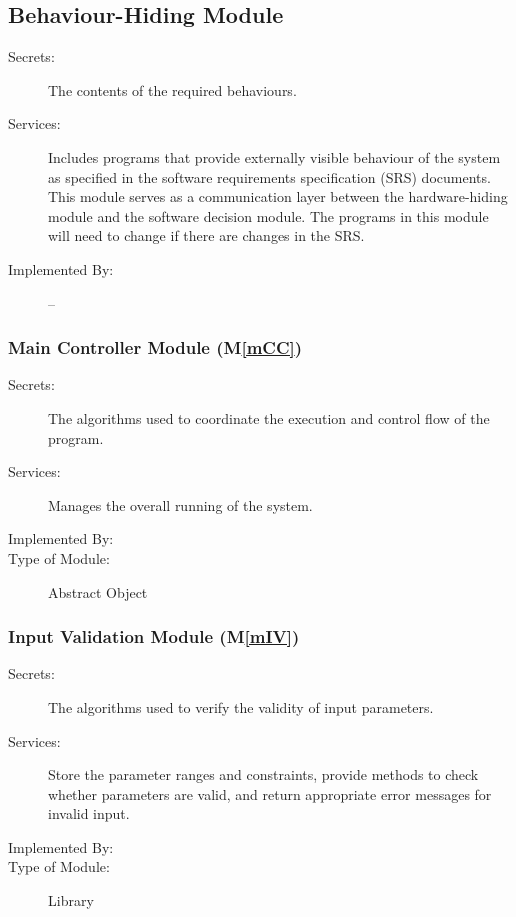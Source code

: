 \documentclass[12pt, titlepage]{article}
\newcommand{\mref}[1]{M\ref{#1}}
\begin{document}
\subsection{Behaviour-Hiding Module}

\begin{description}
\item[Secrets:]The contents of the required behaviours.
\item[Services:]Includes programs that provide externally visible behaviour of
  the system as specified in the software requirements specification (SRS)
  documents. This module serves as a communication layer between the
  hardware-hiding module and the software decision module. The programs in this
  module will need to change if there are changes in the SRS.
\item[Implemented By:] --
\end{description}

\subsubsection{Main Controller Module (\mref{mCC})}

\begin{description}
\item[Secrets:] The algorithms used to coordinate the execution and control 
flow of the program.
\item[Services:] Manages the overall running of the system.
\item[Implemented By:] \progname{}
\item[Type of Module:] Abstract Object
\end{description}

\subsubsection{Input Validation Module (\mref{mIV})}

\begin{description}
\item[Secrets:] The algorithms used to verify the validity of input parameters.
\item[Services:] Store the parameter ranges and constraints, provide methods 
to check whether parameters are valid, and return appropriate error messages 
for invalid input.
\item[Implemented By:] \progname{}
\item[Type of Module:] Library
\end{description}
\end{document}
